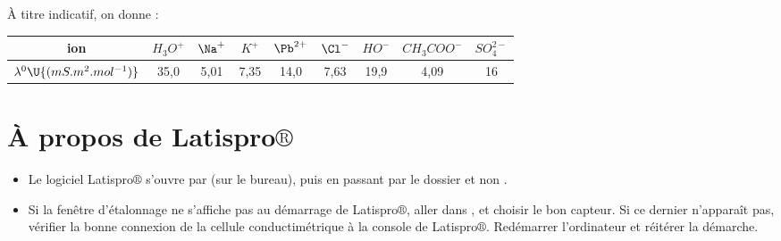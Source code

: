 \documentclass{tp}
\begin{document}
\`A titre indicatif, on donne :
\begin{table}[!h]
\begin{center}
\begin{tabular}{|c|c|c|c|c|c|c|c|c|}
\hline
ion & $H_3O^+$ & $\Na^+$ & $K^+$ & $\Pb^{2+}$  & $\Cl^-$ & $HO^-$ & $CH_3COO^-$ & $SO_4^{2-}$\\
\hline
$\lambda^0 \U{(mS.m^2.mol^{-1})}$ & 35,0 & 5,01 & 7,35 & 14,0 & 7,63 & 19,9 & 4,09 & 16 \\
\hline
\end{tabular}
\end{center}
\end{table}

\vspace{-1cm}

\section{\`A propos de Latispro$\circledR$}

\begin{itemize}

\item [\textbullet] Le logiciel Latispro$\circledR$ s'ouvre par  (sur le bureau), puis en passant par le dossier  et non .

\item [\textbullet] Si la fenêtre d'étalonnage ne s'affiche pas au démarrage de Latispro$\circledR$, aller dans ,  et choisir le bon capteur. Si ce dernier n'apparaît pas, vérifier la bonne connexion de la cellule conductimétrique à la console de Latispro$\circledR$. Redémarrer l'ordinateur et réitérer la démarche.

\end{itemize}
\end{document}

